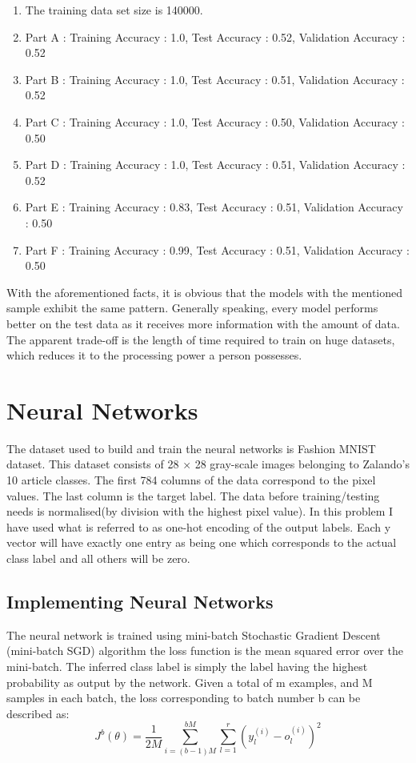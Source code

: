 \documentclass[11pt]{article}
\begin{document}
\hline
\begin{enumerate}
    \item The training data set size is 140000.
    \item Part A : Training Accuracy : 1.0, Test Accuracy : 0.52, Validation Accuracy : 0.52
    \item Part B : Training Accuracy : 1.0, Test Accuracy : 0.51, Validation Accuracy : 0.52
    \item Part C : Training Accuracy : 1.0, Test Accuracy : 0.50, Validation Accuracy : 0.50
    \item Part D : Training Accuracy : 1.0, Test Accuracy : 0.51, Validation Accuracy : 0.52
    \item Part E : Training Accuracy : 0.83, Test Accuracy : 0.51, Validation Accuracy : 0.50
    \item Part F : Training Accuracy : 0.99, Test Accuracy : 0.51, Validation Accuracy : 0.50
\end{enumerate}
\hline
\vspace{3mm}
With the aforementioned facts, it is obvious that the models with the mentioned sample exhibit the same pattern. Generally speaking, every model performs better on the test data as it receives more information with the amount of data. The apparent trade-off is the length of time required to train on huge datasets, which reduces it to the processing power a person possesses.
\section{Neural Networks}
The dataset used to build and train the neural networks is Fashion MNIST dataset. This dataset consists of 28 × 28 gray-scale images belonging to Zalando’s 10 article classes. The first 784 columns of the data correspond to the pixel values. The last column is the target label. The data before training/testing needs is normalised(by division with the highest pixel value). In this problem I have used what is referred to as one-hot encoding of the output labels. Each y vector will have exactly one entry as being one which corresponds to the actual class label and all others will be zero.
\subsection{Implementing Neural Networks}
The neural network is trained using mini-batch Stochastic Gradient Descent (mini-batch SGD) algorithm the loss function is the mean squared error over the mini-batch. The inferred class label is simply the label having the highest probability as output by the network. Given a total of m examples, and M samples in each batch, the loss corresponding to batch number b can be described as:
\begin{equation}
J^{b}(\theta) =  \frac{1}{2M}\sum_{i=(b-1)M}^{bM}\sum_{l=1}^r (y^{(i)}_{l} - o^{(i)}_{l})^2
\end{equation}
\end{document}
